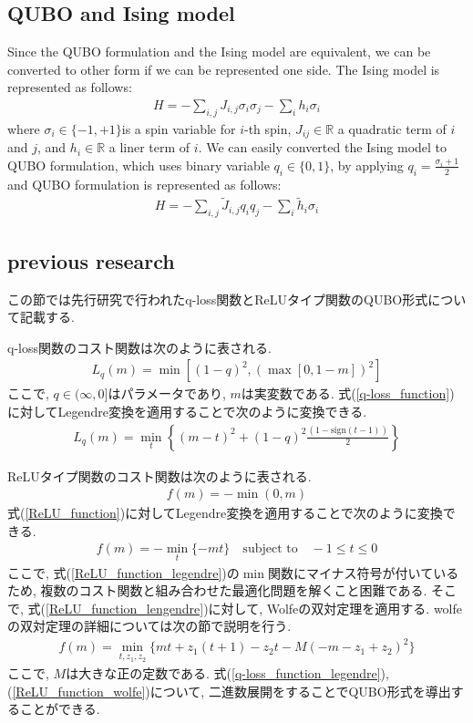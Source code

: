 \documentclass[fp,twocolumn]{jpsj3}
\begin{document}
\subsection{QUBO and Ising model} %
Since the QUBO formulation and the Ising model are equivalent, we can be converted to other form if we can be represented one side. The Ising model is represented as follows:
\begin{eqnarray}
  H=-\sum_{i,j}{J_{i,j}\sigma_{i}\sigma_{j}}-\sum_{i}{h_{i}\sigma_{i}}
\end{eqnarray}
where $\sigma_{i}\in \{-1,+1\}$is a spin variable for $i$-th spin, $J_{ij}\in \mathbb{R}$ a quadratic term of $i$ and $j$, and $h_{i}\in \mathbb{R}$ a liner term of $i$. We can easily converted the Ising model to QUBO formulation, which uses binary variable $q_{i}\in \{0,1\}$, by applying $q_{i}=\frac{\sigma_{i}+1}{2}$ and QUBO formulation is represented as follows:
\begin{eqnarray}
  H=-\sum_{i,j}{\tilde{J}_{i,j}q_{i}q_{j}}-\sum_{i}{\tilde{h}_{i}\sigma_{i}}
\end{eqnarray}

\subsection{previous research}
この節では先行研究で行われたq-loss関数とReLUタイプ関数のQUBO形式について記載する.

q-loss関数のコスト関数は次のように表される.
\begin{eqnarray}
  L_{q}(m)=\min{[(1-q)^{2}, (\max{[0,1-m]})^{2}]} \label{q-loss_function}
\end{eqnarray}
ここで, $q\in (\infty,0]$はパラメータであり, $m$は実変数である. 式(\ref{q-loss_function})に対してLegendre変換を適用することで次のように変換できる.
\begin{eqnarray}
  L_{q}(m)=\min_{t}{\left\{(m-t)^{2}+(1-q)^{2}\frac{(1-\text{sign}(t-1))}{2}\right\}} \label{q-loss_function_legendre}
\end{eqnarray}

ReLUタイプ関数のコスト関数は次のように表される.
\begin{eqnarray}
  f(m)=-\min{(0,m)} \label{ReLU_function}
\end{eqnarray}
式(\ref{ReLU_function})に対してLegendre変換を適用することで次のように変換できる.
\begin{eqnarray}
  f(m)=-\min_{t}{\{-mt\}} \quad \text{subject to} \quad -1\leq t\leq 0 \label{ReLU_function_legendre}
\end{eqnarray}
ここで, 式(\ref{ReLU_function_legendre})の$\min$関数にマイナス符号が付いているため, 複数のコスト関数と組み合わせた最適化問題を解くこと困難である. そこで, 式(\ref{ReLU_function_lengendre})に対して, Wolfeの双対定理を適用する. wolfeの双対定理の詳細については次の節で説明を行う.
\begin{eqnarray}
  f(m)=\min_{t,z_{1},z_{2}}{\{mt+z_{1}(t+1)-z_{2}t-M(-m-z_{1}+z_{2})^{2}\}} \label{ReLU_function_wolfe}
\end{eqnarray}
ここで, $M$は大きな正の定数である.
式(\ref{q-loss_function_legendre}),(\ref{ReLU_function_wolfe})について, 二進数展開をすることでQUBO形式を導出することができる.
\end{document}
